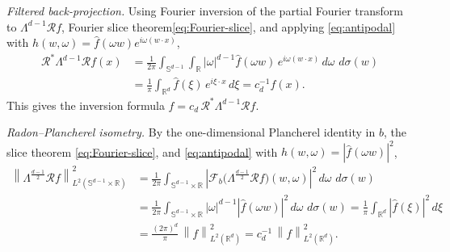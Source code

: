 \documentclass[12pt]{article}
\numberwithin{equation}{section}
\numberwithin{figure}{section}
\numberwithin{equation}{section}
\newcommand{\R}{\mathbb{R}}
\newcommand{\Sph}{\mathbb S}
\newcommand{\ddsigma}{\,d\sigma}
\newcommand{\norm}[1]{\left\|#1\right\|}
\newcommand{\abs}[1]{\left|#1\right|}
\begin{document}
\smallskip\noindent\emph{Filtered back-projection.}
Using Fourier inversion of the partial Fourier transform to
$\Lambda^{d-1}\mathcal Rf$, Fourier slice theorem\eqref{eq:Fourier-slice},
and applying \eqref{eq:antipodal} with $h(w,\omega)=\widehat f(\omega w)e^{i\omega(w\cdot x)}$,
\begin{equation}\label{eq:fbp}
\begin{aligned}
    \mathcal R^*\Lambda^{d-1}\mathcal Rf(x)
    &=\frac1{2\pi}\int_{\Sph^{d-1}}\!\!\int_\R\abs{\omega}^{d-1}
      \widehat f(\omega w)\,e^{i\omega(w\cdot x)}\,d\omega\,\ddsigma(w) \\
    &=\frac1{\pi}\int_{\R^d}\widehat f(\xi)\,e^{i\xi\cdot x}\,d\xi
    =c_d^{-1}f(x).
\end{aligned}
\end{equation}
This gives the inversion formula
$f=c_d\,\mathcal R^*\Lambda^{d-1}\mathcal Rf$.

\smallskip\noindent\emph{Radon--Plancherel isometry.}
By the one-dimensional Plancherel identity in $b$, the slice theorem
\eqref{eq:Fourier-slice}, and \eqref{eq:antipodal} with
$h(w,\omega)=\abs{\widehat f(\omega w)}^2$,
\begin{align}\label{eq:radon-identity}
    \norm{\Lambda^{\frac{d-1}{2}}\mathcal Rf}_{L^2(\Sph^{d-1}\times\R)}^2
    &=\frac1{2\pi}\int_{\Sph^{d-1}\times\R}
      \left|\mathcal F_b\big(\Lambda^{\frac{d-1}{2}}\mathcal Rf\big)(w,\omega)\right|^2
      \,d\omega\,\ddsigma(w) \nonumber\\
    &=\frac1{2\pi}\int_{\Sph^{d-1}\times\R}\abs{\omega}^{d-1}
      \abs{\widehat f(\omega w)}^2\,d\omega\,\ddsigma(w)
    =\frac1{\pi}\int_{\R^d}\abs{\widehat f(\xi)}^2\,d\xi \nonumber\\
    &=\frac{(2\pi)^d}{\pi}\,\norm{f}_{L^2(\R^d)}^2
    =c_d^{-1}\,\norm{f}_{L^2(\R^d)}^2 .
\end{align}
\end{document}
